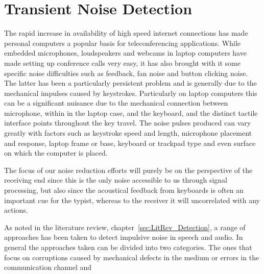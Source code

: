 \chapter{Transient Noise Detection}\label{ch:TransientNoiseDetection}

\ifpdf
    \graphicspath{{Chapter5_TransNoiseDet/Chapter5Figs/PNG/}{Chapter5_TransNoiseDet/Chapter5Figs/PDF/}{Chapter5_TransNoiseDet/Chapter5Figs/}{Chapter5_TransNoiseDet/Chapter5Figs/NoiseBurstModel/}{Chapter5_TransNoiseDet/Chapter5Figs/ARFilterMethod/}}
\else
    \graphicspath{{Chapter5_TransNoiseDet/Chapter5Figs/EPS/}{Chapter5_TransNoiseDet/Chapter5Figs/}}
\fi

The rapid increase in availability of high speed internet connections has made personal computers a popular basis for teleconferencing applications. While embedded microphones, loudspeakers and webcams in laptop computers have made setting up conference calls very easy, it has also brought with it some specific noise difficulties such as feedback, fan noise and button clicking noise. The latter has been a particularly persistent problem and is generally due to the mechanical impulses caused by keystrokes. Particularly on laptop computers this can be a significant nuisance due to the mechanical connection between microphone, within in the laptop case, and the keyboard, and the distinct tactile interface points throughout the key travel. The noise pulses produced can vary greatly with factors such as keystroke speed and length, microphone placement and response, laptop frame or base, keyboard or trackpad type and even surface on which the computer is placed.

The focus of our noise reduction efforts will purely be on the perspective of the receiving end since this is the only noise accessible to us through signal processing, but also since the acoustical feedback from keyboards is often an important cue for the typist, whereas to the receiver it will uncorrelated with any actions.

As noted in the literature review, chapter~\ref{sec:LitRev_Detection}, a range of approaches has been taken to detect impulsive noise in speech and audio. In general the approaches taken can be divided into two categories. The ones that focus on corruptions caused by mechanical defects in the medium or errors in the communication channel and 

